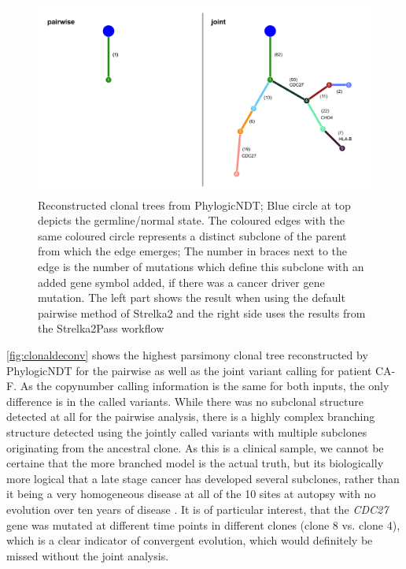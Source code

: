 \begin{figure}[ht]
\centering
\includegraphics[width=.99\linewidth]{Figures/jointVariantCalling/clonalDeconv.pdf}
\caption[Reconstructed clonal trees for joint and pairwise variant calling]{Reconstructed clonal trees from PhylogicNDT; Blue circle at top depicts the germline/normal state. The coloured edges with the same coloured circle represents a distinct subclone of the parent from which the edge emerges; The number in braces next to the edge is the number of mutations which define this subclone with an added gene symbol added, if there was a cancer driver gene mutation. The left part shows the result when using the default pairwise method of Strelka2 and the right side uses the results from the Strelka2Pass workflow}\label{fig:clonaldeconv}
\end{figure}


\autoref{fig:clonaldeconv} shows the highest parsimony clonal tree reconstructed by PhylogicNDT for the pairwise as well as the joint variant calling for patient CA-F. As the copynumber calling information is the same for both inputs, the only difference is in the called variants. While there was no subclonal structure detected at all for the pairwise analysis, there is a highly complex branching structure detected using the jointly called variants with multiple subclones originating from the ancestral clone. As this is a clinical sample, we cannot be certaine that the more branched model is the actual truth, but its biologically more logical that a late stage cancer has developed several subclones, rather than it being a very homogeneous disease at all of the 10 sites at autopsy with no evolution over ten years of disease \cite{Gerstung2020}.
It is of particular interest, that the \textit{CDC27} gene was mutated at different time points in different clones (clone 8 vs. clone 4), which is a clear indicator of convergent evolution, which would definitely be missed without the joint analysis.


